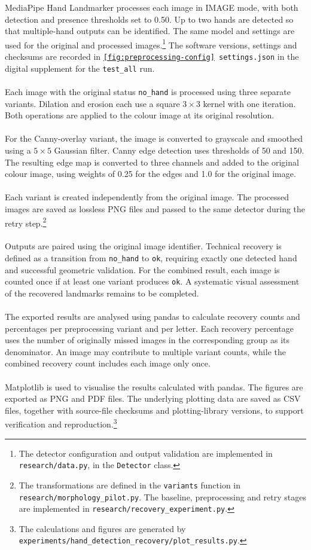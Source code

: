 \documentclass{article}
\begin{document}
        MediaPipe Hand Landmarker processes each image in IMAGE mode, with both detection and presence thresholds set to 0.50. Up to two hands are detected so that multiple-hand outputs can be identified. The same model and settings are used for the original and processed images.\footnote{The detector configuration and output validation are implemented in \texttt{research/data.py}, in the \texttt{Detector} class.} The software versions, settings and checksums are recorded in \texttt{\ref{fig:preprocessing-config} settings.json} in the digital supplement for the \texttt{test\_all} run.
        \\\\
        Each image with the original status \texttt{no\_hand} is processed using three separate variants. Dilation and erosion each use a square $3 \times 3$ kernel with one iteration. Both operations are applied to the colour image at its original resolution.
        \\\\
        For the Canny-overlay variant, the image is converted to grayscale and smoothed using a $5 \times 5$ Gaussian filter. Canny edge detection uses thresholds of 50 and 150. The resulting edge map is converted to three channels and added to the original colour image, using weights of 0.25 for the edges and 1.0 for the original image.
        \\\\
        Each variant is created independently from the original image. The processed images are saved as lossless PNG files and passed to the same detector during the retry step.\footnote{The transformations are defined in the \texttt{variants} function in \texttt{research/morphology\_pilot.py}. The baseline, preprocessing and retry stages are implemented in \texttt{research/recovery\_experiment.py}.}
        \\\\
        Outputs are paired using the original image identifier. Technical recovery is defined as a transition from \texttt{no\_hand} to \texttt{ok}, requiring exactly one detected hand and successful geometric validation. For the combined result, each image is counted once if at least one variant produces \texttt{ok}. A systematic visual assessment of the recovered landmarks remains to be completed.
        \\\\
        The exported results are analysed using pandas to calculate recovery counts and percentages per preprocessing variant and per letter. Each recovery percentage uses the number of originally missed images in the corresponding group as its denominator. An image may contribute to multiple variant counts, while the combined recovery count includes each image only once.
        \\\\
        Matplotlib is used to visualise the results calculated with pandas. The figures are exported as PNG and PDF files. The underlying plotting data are saved as CSV files, together with source-file checksums and plotting-library versions, to support verification and reproduction.\footnote{The calculations and figures are generated by \texttt{experiments/hand\_detection\_recovery/plot\_results.py}.}
        
\end{document}

